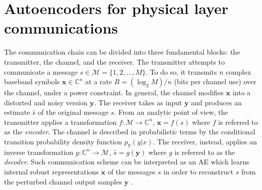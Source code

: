 \section{Autoencoders for physical layer communications}
\label{sec:autoencoders_base}
The communication chain can be divided into three fundamental blocks: the transmitter, the channel, and the receiver. The transmitter attempts to communicate a message $s\in \mathcal{M} = \{1,2,\dots,M\}$. To do so, it transmits $n$ complex baseband symbols $\mathbf{x}\in \mathbb{C}^{n}$ at a rate $R=(\log_2 M)/n$ (bits per channel use) over the channel, under a power constraint. In general, the channel modifies $\mathbf{x}$ into a distorted and noisy version $\mathbf{y}$. The receiver takes as input $\mathbf{y}$ and produces an estimate $\hat{s}$ of the original message $s$. From an analytic point of view, the transmitter applies a transformation $f:\mathcal{M} \to \mathbb{C}^{n}$, $\mathbf{x}=f(s)$ where $f$ is referred to as the \textit{encoder}. The channel is described in probabilistic terms by the conditional transition probability density function $p_Y(y|x)$. The receiver, instead, applies an inverse transformation $g: \mathbb{C}^{n} \to \mathcal{M}$, $\hat{s}= g(\mathbf{y})$ where $g$ is referred to as the \textit{decoder}. Such communication scheme can be interpreted as an AE which learns internal robust representations $\mathbf{x}$ of the messages $s$ in order to reconstruct $s$ from the perturbed channel output samples $\mathbf{y}$ \cite{Oshea2017}. 


